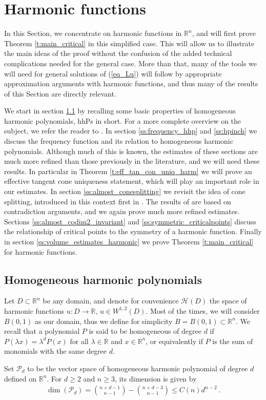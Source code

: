 \documentclass[11pt]{article}
\begin{document}
\section{Harmonic functions}\label{s:harmonic}
In this Section, we concentrate on harmonic functions in ${\mathbb{R}}^n$, and will first prove Theorem \ref{t:main_critical} in this simplified case.  This will allow us to illustrate the main ideas of the proof without the confusion of the added technical complications needed for the general case.  More than that, many of the tools we will need for general solutions of (\ref{eq_Lu}) will follow by appropriate approximation arguments with harmonic functions, and thus many of the results of this Section are directly relevant.

We start in section \ref{ss:hhp} by recalling some basic properties of homogeneous harmonic polynomials, hhPs in short. For a more complete overview on the subject, we refer the reader to \cite{HFT}.  In section \ref{ss:frequency_hhp} and \ref{ss:hpinch} we discuss the frequency function and its relation to homogeneous harmonic polynomials.  Although much of this is known, the estimates of these sections are much more refined than those previously in the literature, and we will need these results.  In particular in Theorem \ref{t:eff_tan_con_uniq_harm} we will prove an effective tangent cone uniqueness statement, which will play an important role in our estimates.  In section \ref{ss:almost_conesplitting} we revisit the idea of cone splitting, introduced in this context first in \cite{chnava}.  The results of \cite{chnava} are based on contradiction arguments, and we again prove much more refined estimates.  Sections \ref{ss:almost_codim2_invariant} and \ref{ss:symmetric_criticalpoints} discuss the relationship of critical points to the symmetry of a harmonic function.  Finally in section \ref{ss:volume_estimates_harmonic} we prove Theorem \ref{t:main_critical} for harmonic functions.

\subsection{Homogeneous harmonic polynomials}\label{ss:hhp}
Let $D\subset {\mathbb{R}}^n$ be any domain, and denote for convenience ${\mathcal{H}}(D)$ the space of harmonic functions $u:D\to {\mathbb{R}}$, $u\in W^{1,2}(D)$. Most of the times, we will consider $B(0,1)$ as our domain, thus we define for simplicity $B=B(0,1)\subset {\mathbb{R}}^n$. We recall that a polynomial $P$ is said to be homogeneous of degree $d$ if $P(\lambda x)=\lambda^d P(x)$ for all $\lambda\in {\mathbb{R}}$ and $x\in {\mathbb{R}}^n$, or equivalently if $P$ is the sum of monomials with the same degree $d$. 
\begin{definition}
 Set ${\mathcal{P}}_{d}$ to be the vector space of homogeneous harmonic polynomial of degree $d$ defined on ${\mathbb{R}}^n$. For $d\geq 2$ and $n\geq 3$, its dimension is given by
 \begin{gather}
  \operatorname{dim}({\mathcal{P}}_d) = \binom{n+d-1}{n-1}-\binom{n+d-3}{n-1} \leq C(n) d^{n-2}\, .
 \end{gather}
\end{definition}
\end{document}
